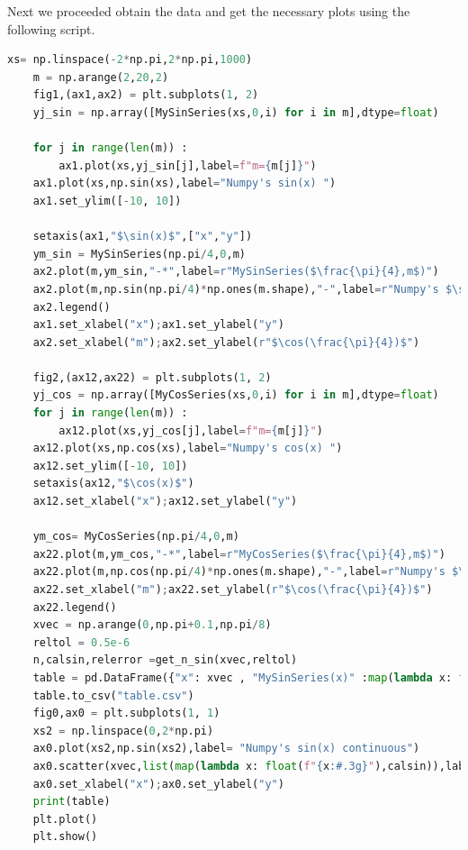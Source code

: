 \documentclass[12pt]{article}
\begin{document}
\noindent
Next we proceeded obtain the data and get the necessary plots using the following script.
\begin{lstlisting}[language=Python]
    xs= np.linspace(-2*np.pi,2*np.pi,1000)
    m = np.arange(2,20,2)
    fig1,(ax1,ax2) = plt.subplots(1, 2)
    yj_sin = np.array([MySinSeries(xs,0,i) for i in m],dtype=float)
    
    for j in range(len(m)) : 
        ax1.plot(xs,yj_sin[j],label=f"m={m[j]}")
    ax1.plot(xs,np.sin(xs),label="Numpy's sin(x) ")
    ax1.set_ylim([-10, 10])
    
    setaxis(ax1,"$\sin(x)$",["x","y"])
    ym_sin = MySinSeries(np.pi/4,0,m) 
    ax2.plot(m,ym_sin,"-*",label=r"MySinSeries($\frac{\pi}{4},m$)")
    ax2.plot(m,np.sin(np.pi/4)*np.ones(m.shape),"-",label=r"Numpy's $\sin(\frac{\pi}{4})$")
    ax2.legend()
    ax1.set_xlabel("x");ax1.set_ylabel("y")
    ax2.set_xlabel("m");ax2.set_ylabel(r"$\cos(\frac{\pi}{4})$")

    fig2,(ax12,ax22) = plt.subplots(1, 2)
    yj_cos = np.array([MyCosSeries(xs,0,i) for i in m],dtype=float)
    for j in range(len(m)) : 
        ax12.plot(xs,yj_cos[j],label=f"m={m[j]}")
    ax12.plot(xs,np.cos(xs),label="Numpy's cos(x) ")
    ax12.set_ylim([-10, 10])
    setaxis(ax12,"$\cos(x)$")
    ax12.set_xlabel("x");ax12.set_ylabel("y")

    ym_cos= MyCosSeries(np.pi/4,0,m) 
    ax22.plot(m,ym_cos,"-*",label=r"MyCosSeries($\frac{\pi}{4},m$)")
    ax22.plot(m,np.cos(np.pi/4)*np.ones(m.shape),"-",label=r"Numpy's $\cos(\frac{\pi}{4})$")
    ax22.set_xlabel("m");ax22.set_ylabel(r"$\cos(\frac{\pi}{4})$")
    ax22.legend()
    xvec = np.arange(0,np.pi+0.1,np.pi/8)
    reltol = 0.5e-6
    n,calsin,relerror =get_n_sin(xvec,reltol)
    table = pd.DataFrame({"x": xvec , "MySinSeries(x)" :map(lambda x: f"{x:#.9g}",calsin),"n":n ,"Numpy's sin(x)":map(lambda x: f"{x:#.9g}",np.sin(xvec))})
    table.to_csv("table.csv")
    fig0,ax0 = plt.subplots(1, 1)
    xs2 = np.linspace(0,2*np.pi)
    ax0.plot(xs2,np.sin(xs2),label= "Numpy's sin(x) continuous")
    ax0.scatter(xvec,list(map(lambda x: float(f"{x:#.3g}"),calsin)),label = "MySinSeries() with 3 significant digits")
    ax0.set_xlabel("x");ax0.set_ylabel("y")
    print(table)
    plt.plot()
    plt.show()
\end{lstlisting}

%
\newpage
\end{document}
